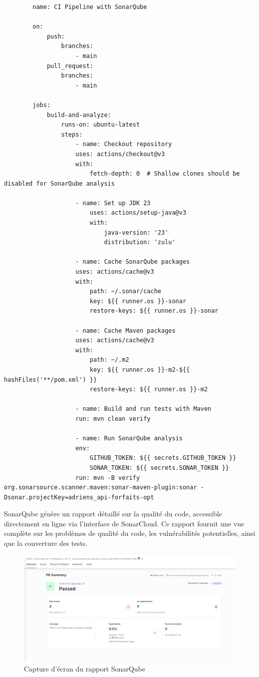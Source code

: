 \documentclass{article}
\begin{document}
	\begin{lstlisting}
		name: CI Pipeline with SonarQube
		
		on:
			push:
				branches:
					- main
			pull_request:
				branches:
					- main
		
		jobs:
			build-and-analyze:
				runs-on: ubuntu-latest
				steps:
					- name: Checkout repository
					uses: actions/checkout@v3
					with:
						fetch-depth: 0  # Shallow clones should be disabled for SonarQube analysis
		
					- name: Set up JDK 23
						uses: actions/setup-java@v3
						with:
							java-version: '23'
							distribution: 'zulu'
					
					- name: Cache SonarQube packages
					uses: actions/cache@v3
					with:
						path: ~/.sonar/cache
						key: ${{ runner.os }}-sonar
						restore-keys: ${{ runner.os }}-sonar
					
					- name: Cache Maven packages
					uses: actions/cache@v3
					with:
						path: ~/.m2
						key: ${{ runner.os }}-m2-${{ hashFiles('**/pom.xml') }}
						restore-keys: ${{ runner.os }}-m2
					
					- name: Build and run tests with Maven
					run: mvn clean verify
					
					- name: Run SonarQube analysis
					env:
						GITHUB_TOKEN: ${{ secrets.GITHUB_TOKEN }}
						SONAR_TOKEN: ${{ secrets.SONAR_TOKEN }}
					run: mvn -B verify org.sonarsource.scanner.maven:sonar-maven-plugin:sonar -Dsonar.projectKey=adriens_api-forfaits-opt
	\end{lstlisting}
	SonarQube génère un rapport détaillé sur la qualité du code, accessible directement en ligne via l'interface de SonarCloud. Ce rapport fournit une vue complète sur les problèmes de qualité du code, les vulnérabilités potentielles, ainsi que la couverture des tests.
	\begin{figure}[h!]
		\centering
		\includegraphics[width=\textwidth]{asset/sonarq.png}
		\caption{Capture d'écran du rapport SonarQube}
		\label{fig:sonarq-report}
	\end{figure}
\end{document}
